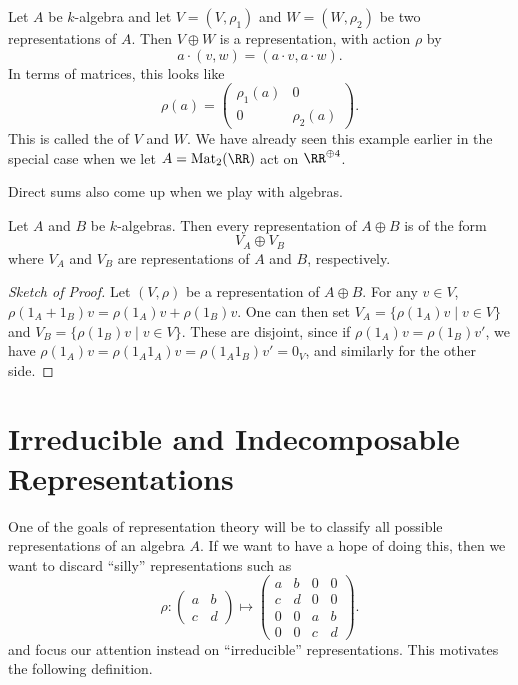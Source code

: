 \documentclass[11pt]{scrreprt}
\begin{document}
\begin{example}
	Let $A$ be $k$-algebra and let $V = (V, \rho_1)$ and $W = (W, \rho_2)$
	be two representations of $A$.
	Then $V \oplus W$ is a representation, with action $\rho$ by
	\[ a \cdot (v,w) = (a \cdot v, a \cdot w). \]
	In terms of matrices, this looks like
	\[ \rho(a) = \begin{pmatrix}
			\rho_1(a) & 0 \\ 0 & \rho_2(a)
		\end{pmatrix}. \]
	This is called the  of $V$ and $W$.
	We have already seen this example earlier in the special case
	when we let $A = \Mat_2(\RR)$ act on $\RR^{\oplus 4}$.
\end{example}

Direct sums also come up when we play with algebras.
\begin{proposition}
	\label{prop:rep_direct_sum}
	Let $A$ and $B$ be $k$-algebras.
	Then every representation of $A \oplus B$ is of the form 
	\[ V_A \oplus V_B \]
	where $V_A$ and $V_B$ are representations of $A$ and $B$, respectively.
\end{proposition}
\begin{proof}[Sketch of Proof]
	Let $(V, \rho)$ be a representation of $A \oplus B$.
	For any $v \in V$, $\rho(1_A+1_B)v = \rho(1_A)v + \rho(1_B)v$.
	One can then set $V_A = \{ \rho(1_A)v \mid v \in V \}$
	and $V_B = \{ \rho(1_B)v \mid v \in V \}$.
	These are disjoint, since if $\rho(1_A) v = \rho(1_B) v'$,
	we have $\rho(1_A)v = \rho(1_A1_A)v = \rho(1_A1_B) v' = 0_V$,
	and similarly for the other side.
\end{proof}

\section{Irreducible and Indecomposable Representations}

One of the goals of representation theory will be to classify
all possible representations of an algebra $A$.
If we want to have a hope of doing this,
then we want to discard ``silly'' representations such as
\[
	\rho : 
	\begin{pmatrix} a & b \\ c & d \end{pmatrix} 
	\mapsto
	\begin{pmatrix} a & b & 0 & 0 \\ c & d & 0 & 0 \\
		0 & 0 & a & b \\ 0 & 0 & c & d \end{pmatrix} .
\]
and focus our attention instead on ``irreducible'' representations.
This motivates the following definition.
\end{document}
